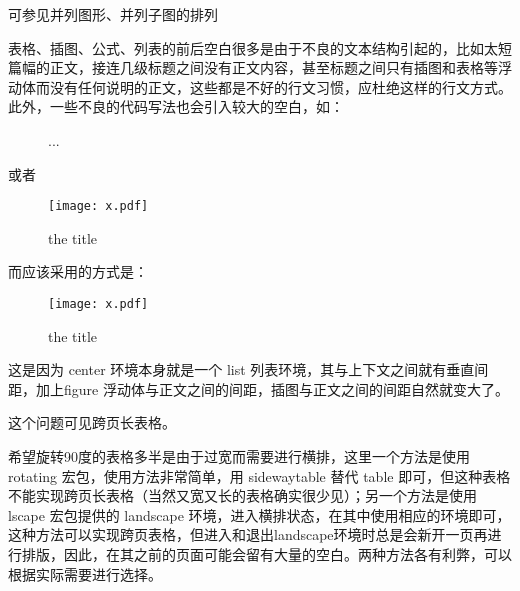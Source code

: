 
可参见并列图形、并列子图的排列



表格、插图、公式、列表的前后空白很多是由于不良的文本结构引起的，比如太短篇幅的正文，接连几级标题之间没有正文内容，甚至标题之间只有插图和表格等浮动体而没有任何说明的正文，这些都是不好的行文习惯，应杜绝这样的行文方式。此外，一些不良的代码写法也会引入较大的空白，如：

\begin{texinlist}
\begin{center}
  \begin{figure}
  ...
  \end{figure}
\end{center}
\end{texinlist}

或者

\begin{texinlist}
\begin{figure}
  \begin{center}
  \texttt{[image: x.pdf]}
  \caption{the title}
  \end{center}
\end{figure}
\end{texinlist}

而应该采用的方式是：

\begin{texinlist}
\begin{figure}
\centering
\texttt{[image: x.pdf]}
\caption{the title}
\end{figure}
\end{texinlist}

这是因为 center 环境本身就是一个 list
列表环境，其与上下文之间就有垂直间距，加上figure
浮动体与正文之间的间距，插图与正文之间的间距自然就变大了。



这个问题可见跨页长表格。



希望旋转90度的表格多半是由于过宽而需要进行横排，这里一个方法是使用
rotating 宏包，使用方法非常简单，用 sidewaytable 替代 table
即可，但这种表格不能实现跨页长表格（当然又宽又长的表格确实很少见）；另一个方法是使用lscape
宏包提供的 landscape
环境，进入横排状态，在其中使用相应的环境即可，这种方法可以实现跨页表格，但进入和退出landscape环境时总是会新开一页再进行排版，因此，在其之前的页面可能会留有大量的空白。两种方法各有利弊，可以根据实际需要进行选择。


